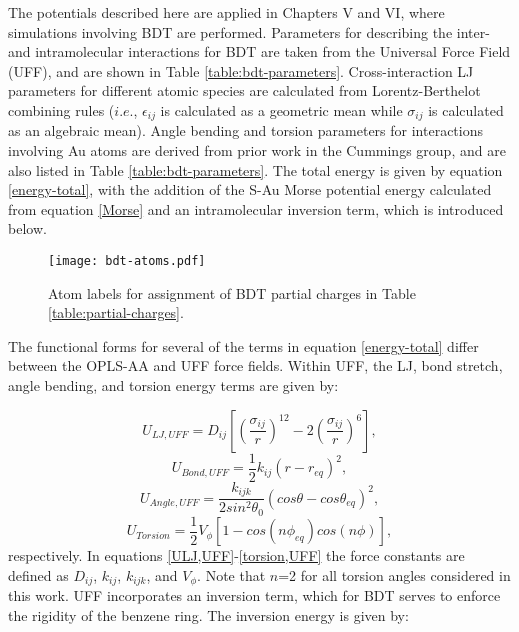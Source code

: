 \documentclass[10pt]{report}  %
\newcommand\findent{\hspace*{\parindent}}
\begin{document}
\findent The potentials described here are applied in Chapters V and VI, where simulations involving BDT are performed. Parameters for describing the inter- and intramolecular interactions for BDT are taken from the Universal Force Field (UFF), \cite{Rappe:1992}  and are shown in Table \ref{table:bdt-parameters}. Cross-interaction LJ parameters for different atomic species are calculated from Lorentz-Berthelot combining rules ($i.e.$, $\epsilon_{ij}$ is calculated as a geometric mean while $\sigma_{ij}$ is calculated as an algebraic mean). Angle bending and torsion parameters for interactions involving Au atoms are derived from prior work in the Cummings group, \cite{Leng:2005} and are also listed in Table \ref{table:bdt-parameters}. The total energy is given by equation \ref{energy-total}, with the addition of the S-Au Morse potential energy calculated from equation \ref{Morse} and an intramolecular inversion term, which is introduced below. 

\begin{figure}[t!]
	\centering
	\texttt{[image: bdt-atoms.pdf]}
	\caption{Atom labels for assignment of BDT partial charges in Table \ref{table:partial-charges}. }
	\label{fig:bdt-atoms}
\end{figure}

The functional forms for several of the terms in equation \ref{energy-total} differ between the OPLS-AA and UFF force fields. Within UFF, the LJ, bond stretch, angle bending, and torsion energy terms are given by:  

\begin{equation} U_{LJ,UFF} = D_{ij}\left[\left(\frac{\sigma_{ij}}{r}\right)^{12}-2\left(\frac{\sigma_{ij}}{r}\right)^{6}\right],\label{ULJ,UFF}
\end{equation} \begin{equation}U_{Bond,UFF} = \frac{1}{2}k_{ij}\left(r - r_{eq}\right)^{2} ,\label{bond-stretch,UFF}\end{equation} \begin{equation}U_{Angle,UFF} = \frac{k_{ijk}}{2sin^{2}\theta_{0}}\left(cos\theta - cos\theta_{eq}\right)^{2} ,\label{angle-bend,UFF}\end{equation} \begin{equation} U_{Torsion} = \frac{1}{2}V_{\phi}\left[1-cos(n\phi_{eq})cos(n\phi)\right],\label{torsion,UFF}\end{equation} respectively. In equations \ref{ULJ,UFF}-\ref{torsion,UFF} the force constants are defined as $D_{ij}$, $k_{ij}$, $k_{ijk}$, and $V_{\phi}$. Note that $n$=2 for all torsion angles considered in this work. UFF incorporates an inversion term, which for BDT serves to enforce the rigidity of the benzene ring. The inversion energy is given by:
\end{document}
